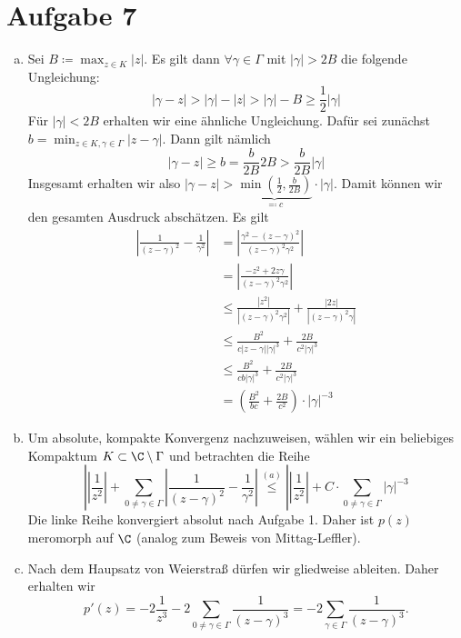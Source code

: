 \documentclass{article}
\begin{document}
  \section*{Aufgabe 7}
  \begin{enumerate}[(a)]
    \item Sei $B \coloneqq \max_{z \in K} |z|$. Es gilt dann $\forall \gamma \in \Gamma$ mit $|\gamma| > 2B$ die folgende Ungleichung:
    \[
        |\gamma - z| > |\gamma| - |z| > |\gamma| - B \geq \frac{1}{2}|\gamma|
    \]
    Für $|\gamma| < 2B$ erhalten wir eine ähnliche Ungleichung. Dafür sei zunächst $b = \min_{z\in K, \gamma \in \Gamma} |z - \gamma|$. Dann gilt nämlich
    \[
        |\gamma - z| \geq b = \frac{b}{2B}2B > \frac{b}{2B}|\gamma|
    \]
    Insgesamt erhalten wir also $|\gamma - z| > \underbrace{\min\left(\frac{1}{2}, \frac{b}{2B}\right)}_{\eqqcolon c} \cdot |\gamma|$.
    Damit können wir den gesamten Ausdruck abschätzen.
    Es gilt
    \begin{align*}
      \left| \frac{1}{(z-\gamma)^2} - \frac{1}{\gamma^2}\right| &=  \left|\frac{\gamma^2 - (z - \gamma)^2}{(z-\gamma)^2\gamma^2}\right|\\
      &= \left|\frac{-z^2 + 2z\gamma}{(z-\gamma)^2\gamma^2}\right|\\
      &\leq \frac{|z^2|}{|(z-\gamma)^2\gamma^2|} + \frac{|2z|}{|(z-\gamma)^2 \gamma|}\\
      &\leq \frac{B^2}{c |z - \gamma| |\gamma|^3} + \frac{2B}{c^2 |\gamma|^3}\\
      &\leq \frac{B^2}{c b |\gamma|^3} + \frac{2B}{c^2 |\gamma|^3}\\
      &= \left(\frac{B^2}{bc} + \frac{2B}{c^2}\right) \cdot |\gamma|^{-3}
    \end{align*}
    \item Um absolute, kompakte Konvergenz nachzuweisen, wählen wir ein beliebiges Kompaktum $K \subset \C\setminus \Gamma$ und betrachten die Reihe
    \[
        |\left|\frac{1}{z^2}\right| + \sum_{0 \neq \gamma \in \Gamma} \left|\frac{1}{(z-\gamma)^2} - \frac{1}{\gamma^2}\right| \overset{(a)}{\leq} |\left|\frac{1}{z^2}\right| + C \cdot \sum_{0 \neq \gamma \in \Gamma} |\gamma|^{-3}
    \]
    Die linke Reihe konvergiert absolut nach Aufgabe 1. Daher ist $p(z)$ meromorph auf $\C$ (analog zum Beweis von Mittag-Leffler).
    \item Nach dem Haupsatz von Weierstraß dürfen wir gliedweise ableiten. Daher erhalten wir
    \[
        p'(z) = -2 \frac{1}{z^3} - 2 \sum_{0 \neq \gamma \in \Gamma} \frac{1}{(z-\gamma)^3} = -2 \sum_{\gamma \in \Gamma} \frac{1}{(z-\gamma)^3}.
\]
\end{enumerate}
\end{document}
